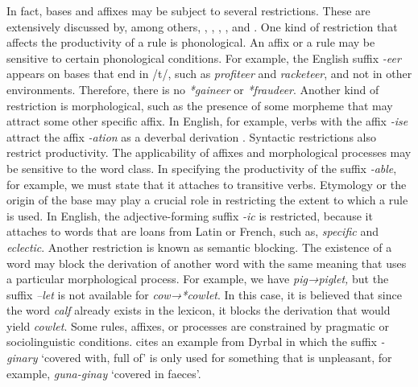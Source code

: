 \documentclass[output=paper]{langsci/langscibook}
\begin{document}
In fact, bases and affixes may be subject to several restrictions. These are extensively discussed by, among others, \citet{Bauer2001}, \citet{HaspelmathSims2010}, \citet{Lieber2009}, \citet{Rainer2005}, and \citet{Plag2006}. One kind of restriction that affects the productivity of a rule is phonological. An affix or a rule may be sensitive to certain phonological conditions. For example, the English suffix \textit{-eer} appears on bases that end in /t/, such as \textit{profiteer} and \textit{racketeer}, and not in other environments. Therefore, there is no \textit{*gaineer} or \textit{*fraudeer}. Another kind of restriction is morphological, such as the presence of some morpheme that may attract some other specific affix. In English, for example, verbs with the affix \textit{-ise} attract the affix \textit{-ation} as a deverbal derivation \citep{Fernandez-Dominguez2013}. Syntactic restrictions also restrict productivity. The applicability of affixes and morphological processes may be sensitive to the word class. In specifying the productivity of the suffix \textit{-able}, for example, we must state that it attaches to transitive verbs. Etymology or the origin of the base may play a crucial role in restricting the extent to which a rule is used. In English, the adjective-forming suffix \textit{-ic} is restricted, because it attaches to words that are loans from Latin or French, such as, \textit{specific} and \textit{eclectic}. Another restriction is known as semantic blocking. The existence of a word may block the derivation of another word with the same meaning that uses a particular morphological process. For example, we have \textit{pig→piglet,} but the suffix \textit{–let} is not available for \textit{cow→*cowlet}. In this case, it is believed that since the word \textit{calf} already exists in the lexicon, it blocks the derivation that would yield \textit{cowlet}. Some rules, affixes, or processes are constrained by pragmatic or sociolinguistic conditions. \citet[135]{Bauer2001} cites an example from Dyrbal in which the suffix \textit{-ginary} ‘covered with, full of’ is only used for something that is unpleasant, for example, \textit{guna-ginay} ‘covered in faeces’. 
\end{document}
